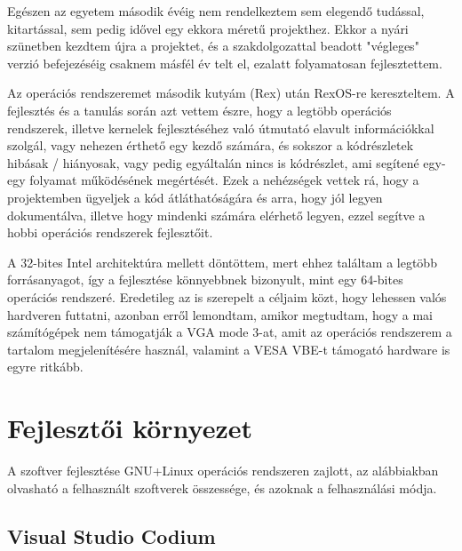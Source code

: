\documentclass[12pt,numbers=noenddot]{report}
\begin{document}
Egészen az egyetem második évéig nem rendelkeztem sem elegendő tudással,
kitartással, sem pedig idővel egy ekkora méretű projekthez. Ekkor a nyári
szünetben kezdtem újra a projektet, és a szakdolgozattal beadott "végleges"
verzió befejezéséig csaknem másfél év telt el, ezalatt folyamatosan
fejlesztettem.

Az operációs rendszeremet második kutyám (Rex) után RexOS-re kereszteltem. A
fejlesztés és a tanulás során azt vettem észre, hogy a legtöbb operációs
rendszerek, illetve kernelek fejlesztéséhez való útmutató elavult információkkal
szolgál, vagy nehezen érthető egy kezdő számára, és sokszor a kódrészletek
hibásak / hiányosak, vagy pedig egyáltalán nincs is kódrészlet, ami segítené
egy-egy folyamat működésének megértését.
Ezek a nehézségek vettek rá, hogy a projektemben ügyeljek a kód átláthatóságára
és arra, hogy jól legyen dokumentálva, illetve hogy mindenki számára elérhető
legyen, ezzel segítve a hobbi operációs rendszerek fejlesztőit.

A 32-bites Intel architektúra mellett döntöttem, mert ehhez találtam a legtöbb
forrásanyagot, így a fejlesztése könnyebbnek bizonyult, mint egy 64-bites
operációs rendszeré. Eredetileg az is szerepelt a céljaim közt, hogy
lehessen valós hardveren futtatni, azonban erről lemondtam, amikor megtudtam,
hogy a mai számítógépek nem támogatják a VGA mode 3-at, amit az operációs
rendszerem a tartalom megjelenítésére használ, valamint a VESA VBE-t támogató
hardware is egyre ritkább.


\chapter{Fejlesztői környezet}

A szoftver fejlesztése GNU+Linux operációs rendszeren zajlott, az alábbiakban
olvasható a felhasznált szoftverek összessége, és azoknak a felhasználási módja.


\section{Visual Studio Codium}
\end{document}
